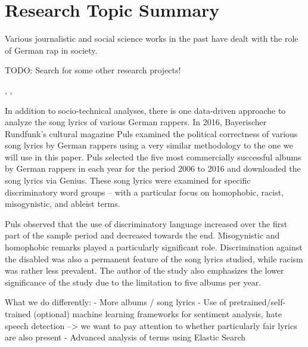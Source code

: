 \section{Research Topic Summary}

Various journalistic and social science works in the past have dealt with the role of German rap in society.

TODO: Search for some other research projects!

\cite{heinisch2018schlampe},
\cite{ahlers_2019},
\cite{wiegel2011deutscher}

In addition to socio-technical analyses, there is one data-driven approache to analyze the song lyrics of various German rappers. In 2016, Bayerischer Rundfunk's cultural magazine Puls \cite{puls_2016} examined the political correctness of various song lyrics by German rappers using a very similar methodology to the one we will use in this paper. Puls selected the five most commercially successful albums by German rappers in each year for the period 2006 to 2016 and downloaded the song lyrics via Genius. These song lyrics were examined for specific discriminatory word groups -- with a particular focus on homophobic, racist, misogynistic, and ableist terms.

Puls observed that the use of discriminatory language increased over the first part of the sample period and decreased towards the end. Misogynistic and homophobic remarks played a particularly significant role. Discrimination against the disabled was also a permanent feature of the song lyrics studied, while racism was rather less prevalent. The author of the study also emphasizes the lower significance of the study due to the limitation to five albums per year.

What we do differently:
- More albums / song lyrics
- Use of pretrained/self-trained (optional) machine learning frameworks for sentiment analysis, hate speech detection --> we want to pay attention to whether particularly fair lyrics are also present
- Advanced analysis of terms using Elastic Search

